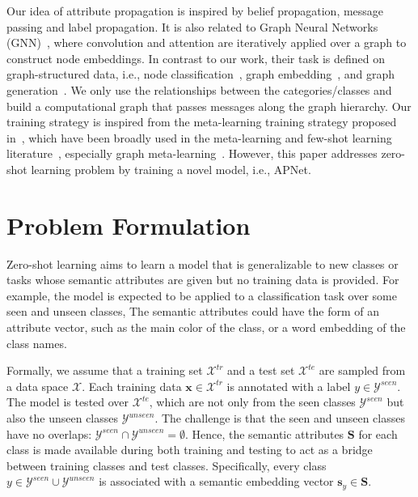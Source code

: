 \documentclass[letterpaper]{article} %
\def\vs{{\bm{s}}}
\def\vx{{\bm{x}}}
\def\mS{{\bm{S}}}
\begin{document}
Our idea of attribute propagation is inspired by belief propagation, message passing and label propagation.
It is also related to Graph Neural Networks (GNN)~\cite{henaff2015deep,wu2019comprehensive}, where convolution and attention are iteratively applied over a graph to construct node embeddings.
In contrast to our work, their task is defined on graph-structured data, i.e., node classification~\cite{hamilton2017inductive}, graph embedding~\cite{pan2018adversarially}, and graph generation~\cite{dai2018syntax}. We only use the relationships between the categories/classes and build a computational graph that passes messages along the graph hierarchy. Our training strategy is inspired from the meta-learning training strategy proposed in~\cite{santoro2016meta}, which have been broadly used in the meta-learning and few-shot learning literature~\cite{finn2017model,snell2017prototypical,dong2019search}, especially graph meta-learning~\cite{liu2019ppn,liu2019GPN}. However, this paper addresses zero-shot learning problem by training a novel model, i.e.,  APNet.


\section{Problem Formulation}
Zero-shot learning aims to learn a model that is generalizable to new classes or tasks whose semantic attributes are given but no training data is provided. For example, the model is expected to be applied to a classification task over some seen and unseen classes,
The semantic attributes could have the form of an attribute vector, such as the main color of the class, or a word embedding  of the class names.

Formally, we assume that a training set $\mathcal{X}^{tr}$ and a test set $\mathcal{X}^{te}$ are sampled from a data space $\mathcal X$. Each training data $\vx \in \mathcal{X}^{tr}$
is annotated with a label $y \in \mathcal{Y}^{seen}$.
The model is tested over $\mathcal{X}^{te}$, which are not only from the seen classes $\mathcal{Y}^{seen}$ but also the unseen classes $\mathcal{Y}^{unseen}$.
The challenge is that the seen and unseen classes have no overlaps: $\mathcal{Y}^{seen} \cap \mathcal{Y}^{unseen} = \emptyset$.
Hence, the semantic attributes $\mS$ for each class is made available during both training and testing to act as a bridge between training classes and test classes. Specifically, every class $y \in \mathcal{Y}^{seen} \cup \mathcal{Y}^{unseen} $ is associated with a semantic embedding vector $\vs_y \in \mS$.
\end{document}
